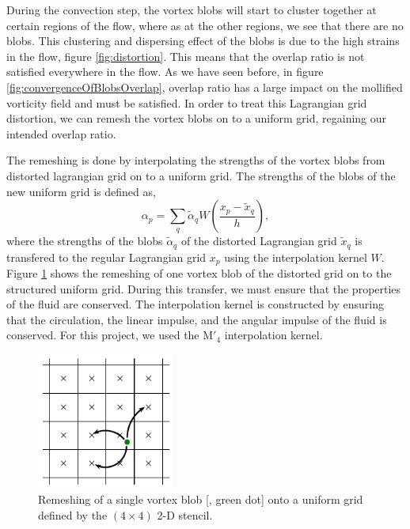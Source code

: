 During the convection step, the vortex blobs will start to cluster together at certain regions of the flow, where as at the other regions, we see that there are no blobs. This clustering and dispersing effect of the blobs is due to the high strains in the flow, figure \ref{fig:distortion}. This means that the overlap ratio is not satisfied everywhere in the flow. As we have seen before, in figure \ref{fig:convergenceOfBlobsOverlap}, overlap ratio has a large impact on the mollified vorticity field and must be satisfied. In order to treat this Lagrangian grid distortion, we can remesh the vortex blobs on to a uniform grid, regaining our intended overlap ratio.

The remeshing is done by interpolating the strengths of the vortex blobs from distorted lagrangian grid on to a uniform grid. The strengths of the blobs of the new uniform grid is defined as,
	\begin{equation}
	\alpha_p = \sum_q\tilde{\alpha}_q W \left(\frac{x_p - \tilde{x}_q}{h}\right),
	\end{equation}
where the strengths of the blobs $\tilde{\alpha}_q$ of the distorted Lagrangian grid $\tilde{x}_q$ is transfered to the regular Lagrangian grid $x_p$ using the interpolation kernel $W$. Figure \ref{fig:interpolationGrid} shows the remeshing of one vortex blob of the distorted grid on to the structured uniform grid. During this transfer, we must ensure that the properties of the fluid are conserved. The interpolation kernel is constructed by ensuring that the circulation, the linear impulse, and the angular impulse of the fluid is conserved. For this project, we used the $\mathrm{M}'_4$ interpolation kernel.

	\begin{figure}[t]
	\centering
	\includegraphics[width=0.4\textwidth]{figures/lagrangian/interpolationGrid.pdf}
	\caption{Remeshing of a single vortex blob [{\color{plotGreen}{$\bullet$}}, green dot] onto a uniform grid defined by the $\left(4\times4\right)$ 2-D stencil.}
	\label{fig:interpolationGrid}
	\end{figure}

